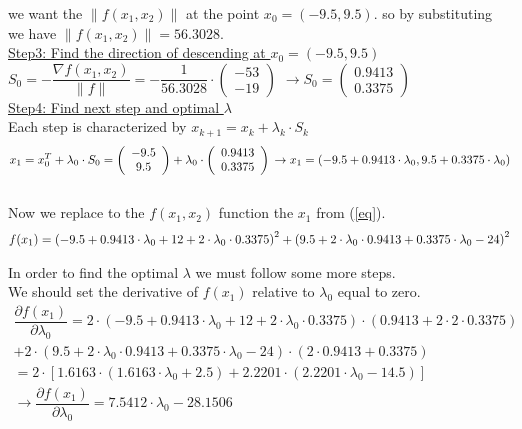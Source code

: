 we want the \(\|f(x_1,x_2)\|\) at the point $x_0 = (-9.5,9.5)$. so by substituting we have \(\|f(x_1,x_2)\| = 56.3028\).
\\[7mm]
\underline{Step3: Find the direction of descending at $x_0 = (-9.5,9.5)$}\\

$S_0 = -\dfrac{\nabla f(x_1,x_2)}{\|f\|} = -\dfrac{1}{56.3028} \cdot \left(\begin{array}{c}
	-53 \\
	-19
\end{array}\right)$ $\rightarrow S_0 = \left(\begin{array}{c}
0.9413 \\
0.3375
\end{array}\right)$
\\[7mm]
\underline{Step4: Find next step and optimal $\lambda$}\\[2mm]
Each step is characterized by $x_{k+1} = x_k + \lambda_k \cdot S_k$
\begin{equation}
	x_1 = x_0^T + \lambda_0 \cdot S_0 = \left(\begin{array}{c}
		-9.5 \\
		9.5
	\end{array}\right) + \lambda_0 \cdot  \left(\begin{array}{c}
		0.9413 \\
		0.3375
	\end{array}\right) \\
	 \rightarrow x_1 = \left(-9.5+0.9413 \cdot \lambda_0, 9.5+0.3375 \cdot \lambda_0\right)
	 \label{eq}
\end{equation}
\\[0.5mm]
Now we replace to the $f(x_1,x_2)$ function the $x_1$ from (\ref{eq}).
\begin{equation}
	\centering
	\begin{gathered}
		f(x_1) = \left(-9.5+0.9413\cdot\lambda_0+12+2 \cdot \lambda_0 \cdot 0.3375 \right)^2+\left(9.5+2 \cdot \lambda_0 \cdot 0.9413+0.3375 \cdot \lambda_0-24\right)^2
	\end{gathered}
\end{equation}
\label{eq4}

In order to find the optimal $\lambda$ we must follow some more steps.\\
We should set the derivative of $f(x_1)$ relative to $\lambda_0$ equal to zero.\\

\[
\begin{gathered}
	\dfrac{\partial f(x_1)}{\partial \lambda_0} = 2 \cdot (-9.5+0.9413 \cdot \lambda_0+12+2 \cdot \lambda_0\cdot 0.3375) \cdot (0.9413+2 \cdot 2 \cdot 0.3375)\\
	 +2 \cdot(9.5+2 \cdot \lambda_0 \cdot 0.9413+0.3375 \cdot \lambda_0 -24) \cdot (2 \cdot 0.9413+0.3375)\\
	 = 2 \cdot [1.6163\cdot(1.6163 \cdot \lambda_0+2.5)+2.2201\cdot(2.2201\cdot\lambda_0-14.5)]\\
	 \rightarrow \dfrac{\partial f(x_1)}{\partial \lambda_0} = 7.5412 \cdot \lambda_0-28.1506
\end{gathered}
\]

